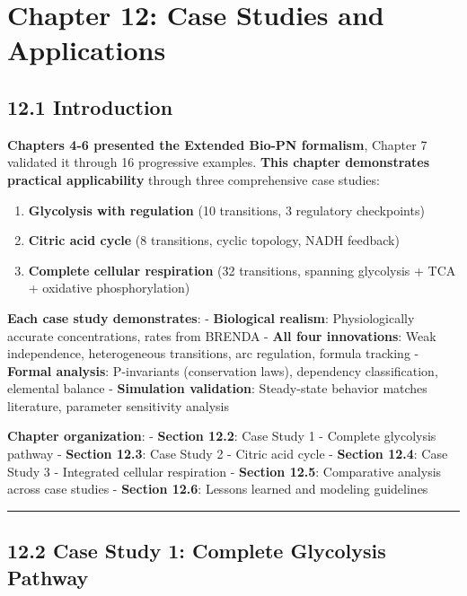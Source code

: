 \hypertarget{chapter-12-case-studies-and-applications}{%
\chapter{Chapter 12: Case Studies and
Applications}\label{chapter-12-case-studies-and-applications}}

\hypertarget{introduction}{%
\section{12.1 Introduction}\label{introduction}}

\textbf{Chapters 4-6 presented the Extended Bio-PN formalism}, Chapter 7
validated it through 16 progressive examples. \textbf{This chapter
demonstrates practical applicability} through three comprehensive case
studies:

\begin{enumerate}
\def\labelenumi{\arabic{enumi}.}
\tightlist
\item
  \textbf{Glycolysis with regulation} (10 transitions, 3 regulatory
  checkpoints)
\item
  \textbf{Citric acid cycle} (8 transitions, cyclic topology, NADH
  feedback)
\item
  \textbf{Complete cellular respiration} (32 transitions, spanning
  glycolysis + TCA + oxidative phosphorylation)
\end{enumerate}

\textbf{Each case study demonstrates}: - \textbf{Biological realism}:
Physiologically accurate concentrations, rates from BRENDA - \textbf{All
four innovations}: Weak independence, heterogeneous transitions, arc
regulation, formula tracking - \textbf{Formal analysis}: P-invariants
(conservation laws), dependency classification, elemental balance -
\textbf{Simulation validation}: Steady-state behavior matches
literature, parameter sensitivity analysis

\textbf{Chapter organization}: - \textbf{Section 12.2}: Case Study 1 -
Complete glycolysis pathway - \textbf{Section 12.3}: Case Study 2 -
Citric acid cycle - \textbf{Section 12.4}: Case Study 3 - Integrated
cellular respiration - \textbf{Section 12.5}: Comparative analysis
across case studies - \textbf{Section 12.6}: Lessons learned and
modeling guidelines

\begin{center}\rule{0.5\linewidth}{0.5pt}\end{center}

\hypertarget{case-study-1-complete-glycolysis-pathway}{%
\section{12.2 Case Study 1: Complete Glycolysis
Pathway}\label{case-study-1-complete-glycolysis-pathway}}

